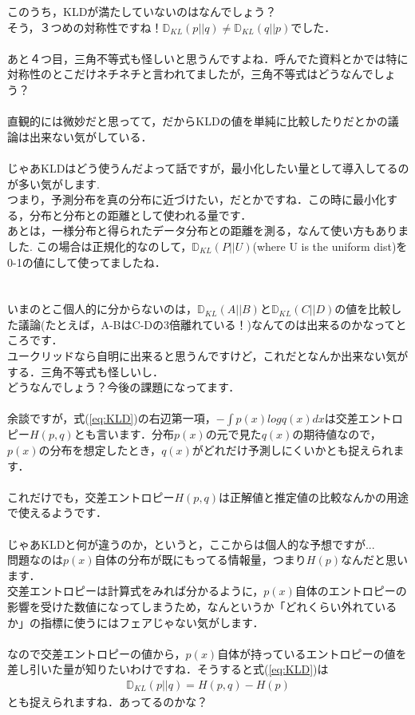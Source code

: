 \documentclass[11pt,a4paper]{jsarticle}                    %
\begin{document}
このうち，KLDが満たしていないのはなんでしょう？\\
そう，３つめの対称性ですね！$\mathbb{D}_{KL}(p||q) \neq \mathbb{D}_{KL}(q||p)$でした．\\
\\
あと４つ目，三角不等式も怪しいと思うんですよね．呼んでた資料とかでは特に対称性のとこだけネチネチと言われてましたが，三角不等式はどうなんでしょう？\\
\\
直観的には微妙だと思ってて，だからKLDの値を単純に比較したりだとかの議論は出来ない気がしている．\\
\\
じゃあKLDはどう使うんだよって話ですが，最小化したい量として導入してるのが多い気がします.\\
つまり，予測分布を真の分布に近づけたい，だとかですね．この時に最小化する，分布と分布との距離として使われる量です．\\
あとは，一様分布と得られたデータ分布との距離を測る，なんて使い方もありました\cite{tort}. この場合は正規化的なのして，$\mathbb{D}_{KL}(P||U)$(where U is the uniform dist)を0-1の値にして使ってましたね．\\
\\
\\
いまのとこ個人的に分からないのは，$\mathbb{D}_{KL}(A||B)$と$\mathbb{D}_{KL}(C||D)$の値を比較した議論(たとえば，A-BはC-Dの3倍離れている！)なんてのは出来るのかなってところです．\\
ユークリッドなら自明に出来ると思うんですけど，これだとなんか出来ない気がする．三角不等式も怪しいし．\\
どうなんでしょう？今後の課題になってます．\\
\\

余談ですが，式(\ref{eq:KLD})の右辺第一項，$- \int p(x) log q(x)dx$は交差エントロピー$H(p,q)$とも言います．分布$p(x)$の元で見た$q(x)$の期待値なので，$p(x)$の分布を想定したとき，$q(x)$がどれだけ予測しにくいかとも捉えられます．\\
\\
これだけでも，交差エントロピー$H(p,q)$は正解値と推定値の比較なんかの用途で使えるようです．\\
\\
じゃあKLDと何が違うのか，というと，ここからは個人的な予想ですが...\\
問題なのは$p(x)$自体の分布が既にもってる情報量，つまり$H(p)$なんだと思います．\\
交差エントロピーは計算式をみれば分かるように，$p(x)$自体のエントロピーの影響を受けた数値になってしまうため，なんというか「どれくらい外れているか」の指標に使うにはフェアじゃない気がします．\\
\\
なので交差エントロピーの値から，$p(x)$自体が持っているエントロピーの値を差し引いた量が知りたいわけですね．そうすると式(\ref{eq:KLD})は
\begin{eqnarray}
\mathbb{D}_{KL}(p||q) = H(p,q) - H(p)
\end{eqnarray}
とも捉えられますね．あってるのかな？
\end{document}
